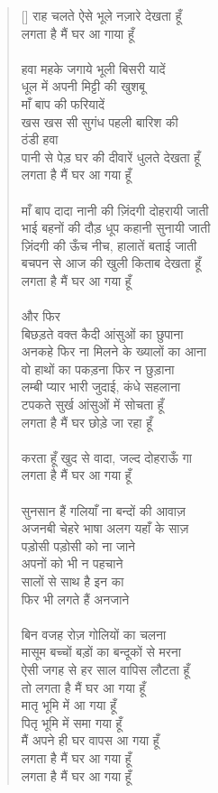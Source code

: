 \begin{verse}[\versewidth]
{राह चलते ऐसे भूले नज़ारे देखता हूँ\\
लगता है मैं घर आ गाया हूँ\\
\\
हवा महके जगाये भूली बिसरी यादें\\
धूल में अपनी मिट्टी की खुशबू\\
माँ बाप की फरियादें\\
खस खस सी सुगंध पहली बारिश की\\
ठंडी हवा\\
पानी से पेड़ घर की दीवारें धुलते देखता हूँ\\
लगता है मैं घर आ गया हूँ\\
\\
माँ बाप दादा नानी की ज़िंदगी दोहरायी जाती\\
भाई बहनों की दौड़ धूप कहानी सुनायी जाती\\
ज़िंदगी की ऊँच नीच, हालातें बताई जाती\\
बचपन से आज की खुली किताब देखता हूँ\\
लगता है मैं घर आ गया हूँ\\
\\
और फिर \\
बिछड़ते वक्त कैदी आंसुओं का छुपाना\\
अनकहे फिर ना मिलने के ख्यालों का आना\\
वो हाथों का पकड़ना फिर न छुड़ाना\\
लम्बी प्यार भारी जुदाई, कंधे सहलाना\\
टपकते सुर्ख आंसुओं में सोचता हूँ\\
लगता है मैं घर छोड़े जा रहा हूँ\\
\\
करता हूँ खुद से वादा, जल्द दोहराऊँ गा\\
लगता है मैं घर आ गया हूँ\\
\\
सुनसान हैं गलियाँ ना बन्दों की आवाज़\\
अजनबी चेहरे भाषा अलग यहाँ के साज़\\
पड़ोसी पड़ोसी को ना जाने\\
अपनों को भी न पहचाने\\
सालों से साथ है इन का\\
फिर भी लगते हैं अनजाने\\
\\
बिन वजह रोज़ गोलियों का चलना\\
मासूम बच्चों बड़ों का बन्दूकों से मरना\\
ऐसी जगह से हर साल वापिस लौटता हूँ\\
तो लगता है मैं घर आ गया हूँ\\
मातृ भूमि में आ गया हूँ\\
पितृ भूमि में समा गया हूँ\\
मैं अपने ही घर वापस आ गया हूँ\\
लगता है मैं घर आ गया हूँ\\
लगता है मैं घर आ गया हूँ
}
\end{verse}

